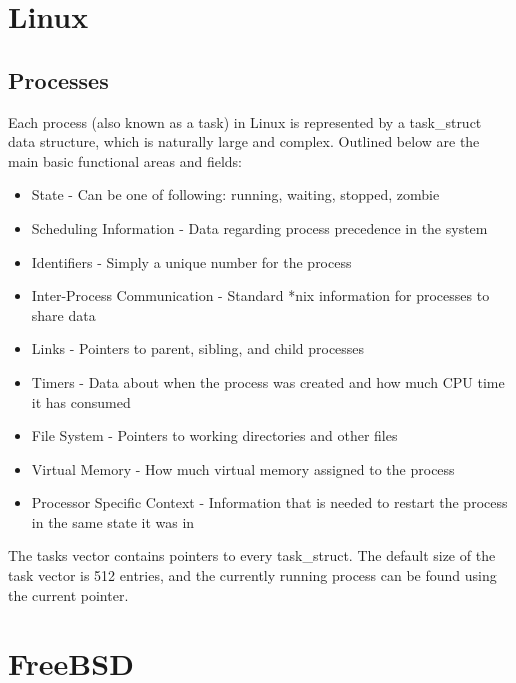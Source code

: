\documentclass[letterpaper,draftclsnofoot,10pt,onecolumn,titlepage]{IEEEtran}\usepackage[margin=0.75in]{geometry}
\begin{document}
\section{Linux}
    \subsection{Processes}
    Each process (also known as a task) in Linux is represented by a task\_struct data structure, which is naturally
    large and complex. Outlined below are the main basic functional areas and fields:

    \begin{itemize}
        \item State - Can be one of following: running, waiting, stopped, zombie
        \item Scheduling Information - Data regarding process precedence in the system
        \item Identifiers - Simply a unique number for the process
        \item Inter-Process Communication - Standard *nix information for processes to share data
        \item Links - Pointers to parent, sibling, and child processes
        \item Timers - Data about when the process was created and how much CPU time it has consumed
        \item File System - Pointers to working directories and other files
        \item Virtual Memory - How much virtual memory assigned to the process
        \item Processor Specific Context - Information that is needed to restart the process in the same state it was in
    \end{itemize}

    The tasks vector contains pointers to every task\_struct. The default size of the task vector is 512 entries, and
    the currently running process can be found using the current pointer.

\section{FreeBSD}
\end{document}
